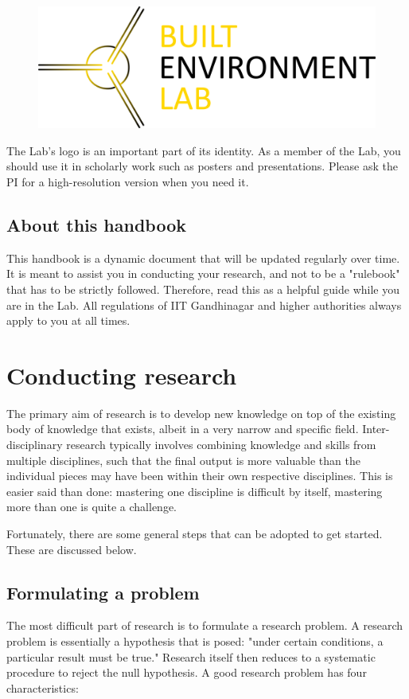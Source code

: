 \documentclass[12pt]{article}
\begin{document}
\begin{figure}[h]
	\centering
	\includegraphics[scale=0.075]{BEL-logo.png}
\end{figure}

The Lab's logo is an important part of its identity. As a member of the Lab, you should use it in scholarly work such as posters and presentations. Please ask the PI for a high-resolution version when you need it.

\subsection{About this handbook}
This handbook is a dynamic document that will be updated regularly over time. It is meant to assist you in conducting your research, and not to be a "rulebook" that has to be strictly followed. Therefore, read this as a helpful guide while you are in the Lab. All regulations of IIT Gandhinagar and higher authorities always apply to you at all times. 

\newpage
\section{Conducting research}
The primary aim of research is to develop new knowledge on top of the existing body of knowledge that exists, albeit in a very narrow and specific field. Inter-disciplinary research typically involves combining knowledge and skills from multiple disciplines, such that the final output is more valuable than the individual pieces may have been within their own respective disciplines. This is easier said than done: mastering one discipline is difficult by itself, mastering more than one is quite a challenge. 

Fortunately, there are some general steps that can be adopted to get started. These are discussed below.

\subsection{Formulating a problem}
The most difficult part of research is to formulate a research problem. A research problem is essentially a hypothesis that is posed: "under certain conditions, a particular result must be true." Research itself then reduces to a systematic procedure to reject the null hypothesis. A good research problem has four characteristics:
\end{document}
